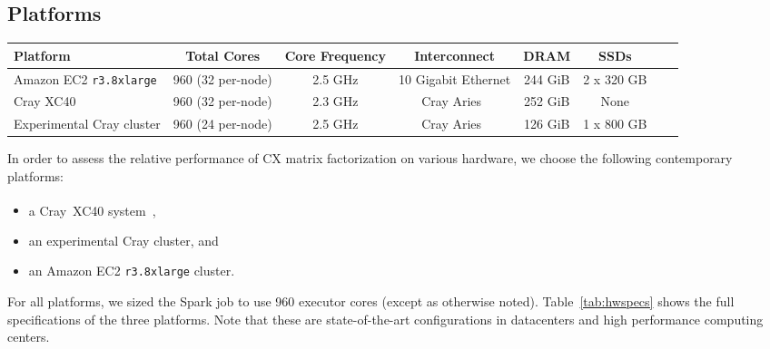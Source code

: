 \subsection{Platforms}

  \begin{table*}
    \begin{center}
    \begin{tabular}{| l | c | c | c | c | c | c | c |}
    \toprule
    \textbf{Platform} & \textbf{Total Cores} & \textbf{Core Frequency} & \textbf{Interconnect} & \textbf{DRAM} & \textbf{SSDs} \\
    \midrule
    Amazon EC2 \texttt{r3.8xlarge} & 960 (32 per-node) & 2.5 GHz & 10 Gigabit Ethernet & 244 GiB & 2 x 320 GB \\
    \midrule
    Cray XC40 & 960 (32 per-node) & 2.3 GHz & Cray Aries~\cite{alverson2012cray,craycascadesc12} & 252 GiB & None \\
    \midrule
    Experimental Cray cluster & 960 (24 per-node) & 2.5 GHz & Cray Aries~\cite{alverson2012cray,craycascadesc12} & 126 GiB & 1 x 800 GB \\
    \bottomrule
    \end{tabular}
    \end{center}
    \caption{Specifications of the three hardware platforms used in these performance experiments.}
    \label{tab:hwspecs}
  \end{table*}

 In order to assess the relative performance of CX matrix factorization on various hardware, we choose the following contemporary platforms:
 \begin{itemize}
 \item a Cray\textregistered~XC40\textsuperscript{\tiny\texttrademark}
 system~\cite{alverson2012cray,craycascadesc12},
 \item an experimental Cray cluster, and
 \item an Amazon EC2 \texttt{r3.8xlarge} cluster.
 \end{itemize}

 For all platforms, we sized the Spark job to use 960 executor cores (except as
 otherwise noted).  Table~\ref{tab:hwspecs} shows the full specifications of
 the three platforms. Note that these are state-of-the-art configurations in
 datacenters and high performance computing centers. 

